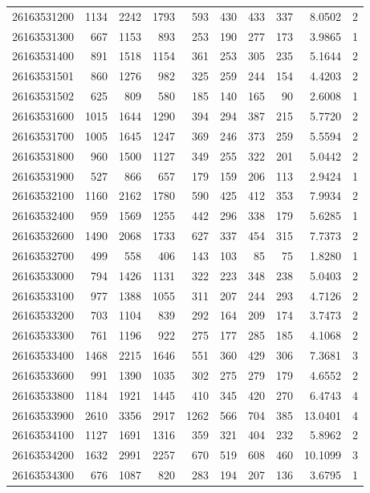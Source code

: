 \documentclass[
  11pt,
]{article}
\begin{document}
\begin{longtable}[t]{lrrrrrrrrr}
26163531200 & 1134 & 2242 & 1793 & 593 & 430 & 433 & 337 & 8.0502 & 2\\
26163531300 & 667 & 1153 & 893 & 253 & 190 & 277 & 173 & 3.9865 & 1\\
26163531400 & 891 & 1518 & 1154 & 361 & 253 & 305 & 235 & 5.1644 & 2\\
26163531501 & 860 & 1276 & 982 & 325 & 259 & 244 & 154 & 4.4203 & 2\\
26163531502 & 625 & 809 & 580 & 185 & 140 & 165 & 90 & 2.6008 & 1\\
26163531600 & 1015 & 1644 & 1290 & 394 & 294 & 387 & 215 & 5.7720 & 2\\
26163531700 & 1005 & 1645 & 1247 & 369 & 246 & 373 & 259 & 5.5594 & 2\\
26163531800 & 960 & 1500 & 1127 & 349 & 255 & 322 & 201 & 5.0442 & 2\\
26163531900 & 527 & 866 & 657 & 179 & 159 & 206 & 113 & 2.9424 & 1\\
26163532100 & 1160 & 2162 & 1780 & 590 & 425 & 412 & 353 & 7.9934 & 2\\
26163532400 & 959 & 1569 & 1255 & 442 & 296 & 338 & 179 & 5.6285 & 1\\
26163532600 & 1490 & 2068 & 1733 & 627 & 337 & 454 & 315 & 7.7373 & 2\\
26163532700 & 499 & 558 & 406 & 143 & 103 & 85 & 75 & 1.8280 & 1\\
26163533000 & 794 & 1426 & 1131 & 322 & 223 & 348 & 238 & 5.0403 & 2\\
26163533100 & 977 & 1388 & 1055 & 311 & 207 & 244 & 293 & 4.7126 & 2\\
26163533200 & 703 & 1104 & 839 & 292 & 164 & 209 & 174 & 3.7473 & 2\\
26163533300 & 761 & 1196 & 922 & 275 & 177 & 285 & 185 & 4.1068 & 2\\
26163533400 & 1468 & 2215 & 1646 & 551 & 360 & 429 & 306 & 7.3681 & 3\\
26163533600 & 991 & 1390 & 1035 & 302 & 275 & 279 & 179 & 4.6552 & 2\\
26163533800 & 1184 & 1921 & 1445 & 410 & 345 & 420 & 270 & 6.4743 & 4\\
26163533900 & 2610 & 3356 & 2917 & 1262 & 566 & 704 & 385 & 13.0401 & 4\\
26163534100 & 1127 & 1691 & 1316 & 359 & 321 & 404 & 232 & 5.8962 & 2\\
26163534200 & 1632 & 2991 & 2257 & 670 & 519 & 608 & 460 & 10.1099 & 3\\
26163534300 & 676 & 1087 & 820 & 283 & 194 & 207 & 136 & 3.6795 & 1\\

\end{longtable}
\end{document}
